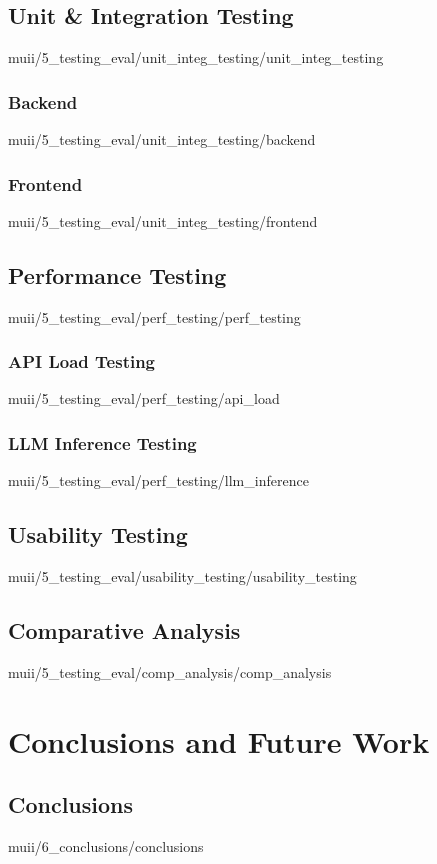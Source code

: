 \documentclass[english,epsbased,copyright,final,printable,covers,extendedindex,firstnumbered,tfm,gnuplot,loc,lof,lot]{tfgtfmthesisuam}
\begin{document}
    \section{Unit \& Integration Testing\label{SEC:UNITINTEGTEST}}{muii/5_testing_eval/unit_integ_testing/unit_integ_testing}
      \subsection{Backend\label{SS:BACKUNITTEST}}{muii/5_testing_eval/unit_integ_testing/backend}
      \subsection{Frontend\label{SS:FRONTTEST}}{muii/5_testing_eval/unit_integ_testing/frontend}

    \section{Performance Testing\label{SEC:PERFORMANCETEST}}{muii/5_testing_eval/perf_testing/perf_testing}
      \subsection{API Load Testing\label{SS:APILAT}}{muii/5_testing_eval/perf_testing/api_load}
      \subsection{LLM Inference Testing\label{SS:LLMLAT}}{muii/5_testing_eval/perf_testing/llm_inference}

    \section{Usability Testing\label{SEC:USABILITYTEST}}{muii/5_testing_eval/usability_testing/usability_testing}

    \section{Comparative Analysis\label{SEC:COMPANALYSIS}}{muii/5_testing_eval/comp_analysis/comp_analysis}

  \chapter{Conclusions and Future Work\label{CAP:CONCLUSIONS}}
    \section{Conclusions\label{SEC:CONCLUSIONS}}{muii/6_conclusions/conclusions}
\end{document}
